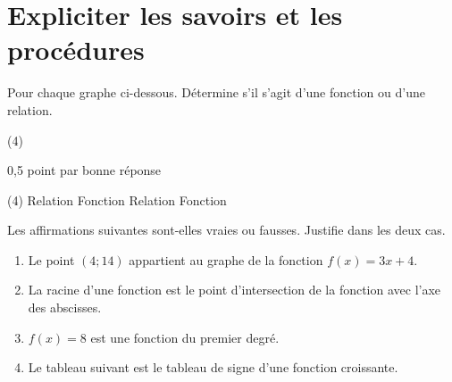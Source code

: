 \documentclass[a4paper, 12pt, parskip=half-]{scrartcl}
\begin{document}
\section*{ Expliciter les savoirs et les procédures}
\begin{exercise}[points=2]
    Pour chaque graphe ci-dessous. Détermine s'il s'agit d'une fonction ou d'une relation.
    \begin{tasks}(4)
        \task 
        \task 
        \task 
        \task 
    \end{tasks}
\end{exercise}
\begin{solution}
    0,5 point par bonne réponse
    \begin{tasks}(4)
        \task Relation
        \task Fonction
        \task Relation
        \task Fonction
    \end{tasks}
\end{solution}
\begin{exercise}[points=4]
    Les affirmations suivantes sont-elles vraies ou fausses. Justifie dans les deux cas.
    \begin{enumerate}
        \item Le point $(4;14)$ appartient au graphe de la fonction $f(x)=3x+4$.
        \item La racine d'une fonction est le point d'intersection de la fonction avec l'axe des abscisses.
        \item $f(x) = 8$ est une fonction du premier degré.
        \item Le tableau suivant est le tableau de signe d'une fonction croissante.
        \begin{center}
        \end{center}
    \end{enumerate}
\end{exercise}
\end{document}
